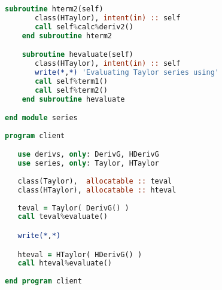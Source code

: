 \documentclass[11pt,oneside]{article}
\begin{document}
\begin{appendices}
\begin{lstlisting}[language=Fortran]
    subroutine hterm2(self)
       class(HTaylor), intent(in) :: self
       call self%calc%deriv2()
    end subroutine hterm2

    subroutine hevaluate(self)
       class(HTaylor), intent(in) :: self
       write(*,*) 'Evaluating Taylor series using'
       call self%term1()
       call self%term2()
    end subroutine hevaluate

end module series
 
program client

   use derivs, only: DerivG, HDerivG
   use series, only: Taylor, HTaylor
   
   class(Taylor),  allocatable :: teval
   class(HTaylor), allocatable :: hteval
   
   teval = Taylor( DerivG() )
   call teval%evaluate()

   write(*,*)

   hteval = HTaylor( HDerivG() )
   call hteval%evaluate()
   
end program client
\end{lstlisting}

\end{appendices}
\end{document}
